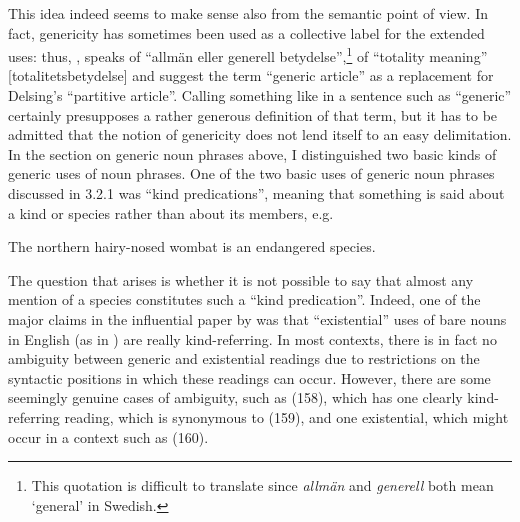 
This idea indeed seems to make sense also from the semantic point of view. In fact, genericity has sometimes been used as a collective label for the extended uses: thus, \citet[134]{Hummelstedt1934}, speaks of “allmän eller generell betydelse”,\footnote{ This quotation is difficult to translate since \textit{allmän} and \textit{generell} both mean ‘general’ in Swedish.} \citet[29]{Marklund1976} of “totality meaning” [totalitetsbetydelse] and \citet{BergholmEtAl1999} suggest the term “generic article” as a replacement for Delsing’s “partitive article”. Calling something like  in a sentence such as  “generic” certainly presupposes a rather generous definition of that term, but it has to be admitted that the notion of genericity does not lend itself to an easy delimitation. In the section on generic noun phrases above, I distinguished two basic kinds of generic uses of noun phrases. One of the two basic uses of generic noun phrases discussed in 3.2.1 was “kind predications”, meaning that something is said about a kind or species rather than about its members, e.g. 


\item 

The northern hairy-nosed wombat is an endangered species. 



The question that arises is whether it is not possible to say that almost any mention of a species constitutes such a “kind predication”. Indeed, one of the major claims in the influential paper by \citet{Carlson1977} was that “existential” uses of bare nouns in English (as in ) are really kind-referring. In most contexts, there is in fact no ambiguity between generic and existential readings due to restrictions on the syntactic positions in which these readings can occur. However, there are some seemingly genuine cases of ambiguity, such as (158), which has one clearly kind-referring reading, which is synonymous to (159), and one existential, which might occur in a context such as (160).

